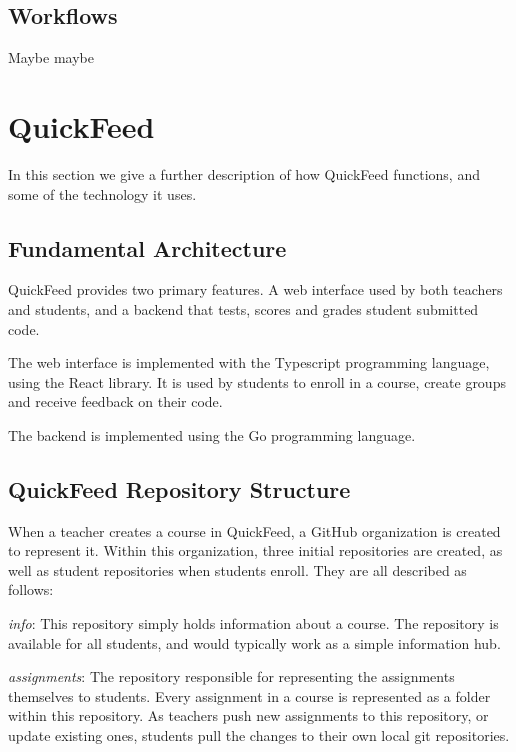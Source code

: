 \subsection{Workflows}

Maybe maybe

\section{QuickFeed}

In this section we give a further description of how QuickFeed functions, and some of the technology it uses.

\subsection{Fundamental Architecture}


QuickFeed provides two primary features.
A web interface used by both teachers and students, and a backend that tests, scores and grades student submitted code.

The web interface is implemented with the Typescript programming language, using the React library.
It is used by students to enroll in a course, create groups and receive feedback on their code.

The backend is implemented using the Go programming language.

\subsection{QuickFeed Repository Structure}

When a teacher creates a course in QuickFeed, a GitHub organization is created to represent it.
Within this organization, three initial repositories are created, as well as student repositories when students enroll.
They are all described as follows:

\textit{info}: This repository simply holds information about a course.
The repository is available for all students, and would typically work as a simple information hub.

\textit{assignments}: The repository responsible for representing the assignments themselves to students.
Every assignment in a course is represented as a folder within this repository.
As teachers push new assignments to this repository, or update existing ones, students pull the changes to their own local git repositories.

